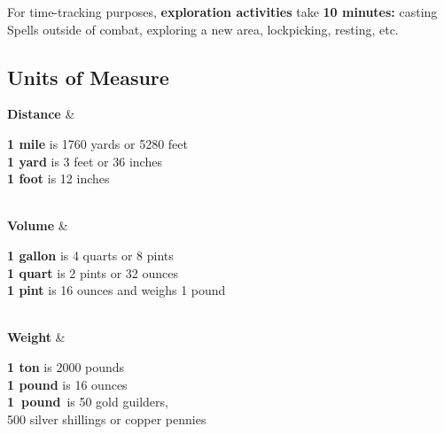 \documentclass[itdr/core]{subfiles}
\begin{document}
For time-tracking purposes, \textbf{exploration activities} take \textbf{10 minutes:} casting Spells outside of combat, exploring a new area, lockpicking, resting, etc.

\vfill

\begin{dbox}
	\vspace{-0.5ex}
	\section{Units of Measure}

\bgroup
\tabcolsep=2.5pt

\begin{dtable}[cL]
	\textbf{Distance} & \parbox{\linewidth}{%
			\textbf{1 mile} is 1760 yards or 5280 feet\\
			\textbf{1 yard} is 3 feet or 36 inches\\
			\textbf{1 foot} is 12 inches} \\
	\midrule
	\textbf{Volume} & \parbox{\linewidth}{%
			\textbf{1 gallon} is 4 quarts or 8 pints\\
			\textbf{1 quart} is 2 pints or 32 ounces\\
			\textbf{1 pint} is 16 ounces and weighs 1 pound} \\
	\midrule
	\textbf{Weight} & \parbox{\linewidth}{%
			\textbf{1 ton} is 2000 pounds\\
			\textbf{1 pound} is 16 ounces\\
			\mbox{\textbf{1 pound} is} 50 gold guilders,\\ 500 silver shillings or copper pennies} \\
\end{dtable}
\egroup

\vspace{-0.5ex}

\end{dbox}
\end{document}
